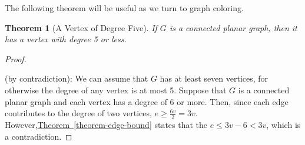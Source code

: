 \documentclass[10pt,]{book}
\theoremstyle{plain}
\newtheorem{theorem}{Theorem}[section]
\theoremstyle{definition}
\theoremstyle{definition}
\theoremstyle{definition}
\theoremstyle{definition}
\theoremstyle{definition}
\numberwithin{equation}{section}
\begin{document}
\par
The following theorem will be useful as we turn to graph coloring.%
\begin{theorem}[A Vertex of Degree Five]\label{theorem-degree-5}
If \(G\) is a connected planar graph, then it has a vertex with degree 5 or less.%
\end{theorem}
\begin{proof}\hypertarget{proof-7}{}
(by contradiction): We can assume that \(G\) has at least seven vertices, for otherwise the degree of any vertex is at most 5.
Suppose that \(G\) is a connected planar graph and each vertex has a degree of 6 or more. Then, since each edge contributes to the degree
of two vertices, \(e\geq \frac{6v}{2}=3v\). However,\hyperref[theorem-edge-bound]{Theorem~\ref{theorem-edge-bound}}  states that the \(e\leq 3v-6 < 3v\), which is a contradiction.%
\end{proof}
\typeout{************************************************}
\typeout{************************************************}
\end{document}
